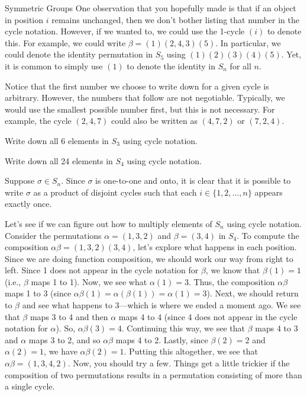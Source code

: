 \begin{section}{Symmetric Groups}
One observation that you hopefully made is that if an object in position $i$ remains unchanged, then we don't bother listing that number in the cycle notation.  However, if we wanted to, we could use the 1-cycle $(i)$ to denote this.  For example, we could write $\beta=(1)(2,4,3)(5)$.  In particular, we could denote the identity permutation in $S_5$ using $(1)(2)(3)(4)(5)$.  Yet, it is common to simply use $(1)$ to denote the identity in $S_n$ for all $n$.

Notice that the first number we choose to write down for a given cycle is arbitrary.  However, the numbers that follow are not negotiable.  Typically, we would use the smallest possible number first, but this is not necessary.  For example, the cycle $(2,4,7)$ could also be written as $(4,7,2)$ or $(7,2,4)$.

\begin{problem}\label{prob:S3-2}
Write down all 6 elements in $S_3$ using cycle notation.
\end{problem}

\begin{problem}\label{prob:S4}
Write down all 24 elements in $S_4$ using cycle notation.
\end{problem}

Suppose $\sigma\in S_n$.  Since $\sigma$ is one-to-one and onto, it is clear that it is possible to write $\sigma$ as a product of disjoint cycles such that each $i\in\{1,2,\ldots, n\}$ appears exactly once.

Let's see if we can figure out how to multiply elements of $S_n$ using cycle notation.  Consider the permutations $\alpha=(1,3,2)$ and $\beta=(3,4)$ in $S_4$.  To compute the composition $\alpha\beta=(1,3,2)(3,4)$, let's explore what happens in each position.  Since we are doing function composition, we should work our way from right to left.  Since 1 does not appear in the cycle notation for $\beta$, we know that $\beta(1)=1$ (i.e., $\beta$ maps 1 to 1).  Now, we see what $\alpha(1)=3$.  Thus, the composition $\alpha\beta$ maps 1 to 3 (since $\alpha\beta(1)=\alpha(\beta(1))=\alpha(1)=3$).  Next, we should return to $\beta$ and see what happens to 3---which is where we ended a moment ago.  We see that $\beta$ maps 3 to 4 and then $\alpha$ maps 4 to 4 (since 4 does not appear in the cycle notation for $\alpha$).  So, $\alpha\beta(3)=4$.  Continuing this way, we see that $\beta$ maps 4 to 3 and $\alpha$ maps 3 to 2, and so $\alpha\beta$ maps 4 to 2.  Lastly, since $\beta(2)=2$ and $\alpha(2)=1$, we have $\alpha\beta(2)=1$.  Putting this altogether, we see that $\alpha\beta=(1,3,4,2)$.  Now, you should try a few.  Things get a little trickier if the composition of two permutations results in a permutation consisting of more than a single cycle.


\end{section}
